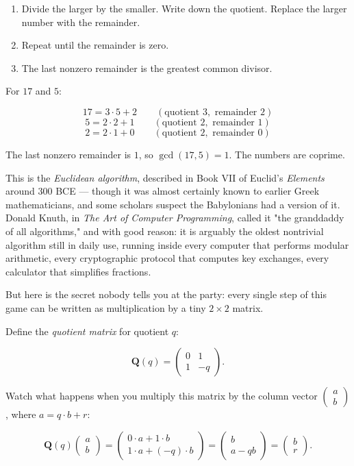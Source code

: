 \begin{enumerate}[leftmargin=*]
\item Divide the larger by the smaller. Write down the quotient. Replace the larger number with the remainder.
\item Repeat until the remainder is zero.
\item The last nonzero remainder is the greatest common divisor.
\end{enumerate}

For $17$ and $5$:

\[
17 = 3 \cdot 5 + 2 \qquad (\text{quotient } 3, \text{ remainder } 2)
\]
\[
5 = 2 \cdot 2 + 1 \qquad (\text{quotient } 2, \text{ remainder } 1)
\]
\[
2 = 2 \cdot 1 + 0 \qquad (\text{quotient } 2, \text{ remainder } 0)
\]

The last nonzero remainder is $1$, so $\gcd(17, 5) = 1$. The numbers are coprime.

This is the \textit{Euclidean algorithm}, described in Book VII of Euclid's \textit{Elements} around 300 BCE --- though it was almost certainly known to earlier Greek mathematicians, and some scholars suspect the Babylonians had a version of it. Donald Knuth, in \textit{The Art of Computer Programming}, called it "the granddaddy of all algorithms," and with good reason: it is arguably the oldest nontrivial algorithm still in daily use, running inside every computer that performs modular arithmetic, every cryptographic protocol that computes key exchanges, every calculator that simplifies fractions.

But here is the secret nobody tells you at the party: every single step of this game can be written as multiplication by a tiny $2 \times 2$ matrix.

Define the \textit{quotient matrix} for quotient $q$:

\[
\mathbf{Q}(q) = \begin{pmatrix} 0 & 1 \\ 1 & -q \end{pmatrix}.
\]

Watch what happens when you multiply this matrix by the column vector $\begin{pmatrix} a \\ b \end{pmatrix}$, where $a = q \cdot b + r$:

\[
\mathbf{Q}(q) \begin{pmatrix} a \\ b \end{pmatrix} = \begin{pmatrix} 0 \cdot a + 1 \cdot b \\ 1 \cdot a + (-q) \cdot b \end{pmatrix} = \begin{pmatrix} b \\ a - qb \end{pmatrix} = \begin{pmatrix} b \\ r \end{pmatrix}.
\]

